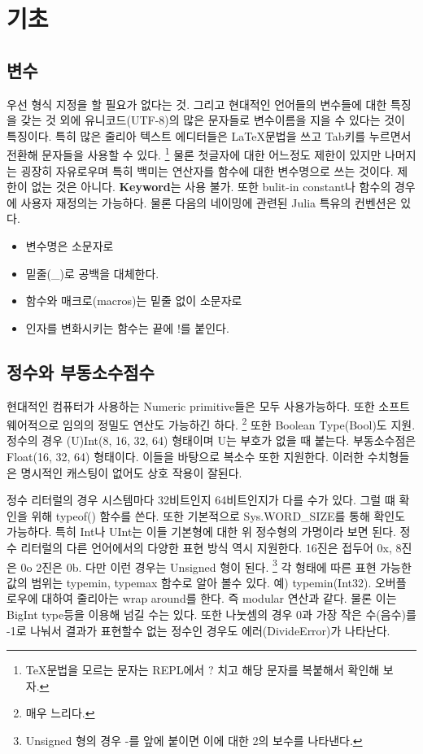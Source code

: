 \documentclass[a4paper, 11pt]{report}
\theoremstyle{definition}
\begin{document}
\section{기초}

\subsection{변수}

우선 형식 지정을 할 필요가 없다는 것. 그리고 현대적인 언어들의 변수들에 대한 특징을 갖는 것 외에
유니코드(UTF-8)의 많은 문자들로 변수이름을 지을 수 있다는 것이 특징이다. 
특히 많은 줄리아 텍스트 에디터들은 \LaTeX 문법을 쓰고 Tab키를 누르면서 전환해 문자들을 사용할 수 있다.
\footnote{\TeX 문법을 모르는 문자는 REPL에서 ? 치고 해당 문자를 복붙해서 확인해 보자.}
물론 첫글자에 대한 어느정도 제한이 있지만 나머지는 굉장히 자유로우며 특히 백미는 연산자를 함수에 대한 변수명으로 쓰는 것이다.
제한이 없는 것은 아니다. \textbf{Keyword}는 사용 불가. 또한 bulit-in constant나 함수의 경우 에 사용자 재정의는 가능하다.
물론 다음의 네이밍에 관련된 Julia 특유의 컨벤션은 있다.
\begin{itemize}
    \item 변수명은 소문자로
    \item 밑줄(\_)로 공백을 대체한다.
    \item 함수와 매크로(macros)는 밑줄 없이 소문자로
    \item 인자를 변화시키는 함수는 끝에 !를 붙인다.
\end{itemize}

\subsection{정수와 부동소수점수}
현대적인 컴퓨터가 사용하는 Numeric primitive들은 모두 사용가능하다. 또한 소프트웨어적으로 임의의 정밀도 연산도 가능하긴 하다.
\footnote{매우 느리다.}
또한 Boolean Type(Bool)도 지원. 정수의 경우  (U)Int(8, 16, 32, 64) 형태이며 U는 부호가 없을 때 붙는다. 부동소수점은 Float(16, 32, 64) 형태이다. 이들을 바탕으로 복소수 또한 지원한다. 이러한 수치형들은 명시적인 캐스팅이 없어도 상호 작용이
잘된다.

정수 리터럴의 경우 시스템마다 32비트인지 64비트인지가 다를 수가 있다. 그럴 떄 확인을 위해 typeof() 함수를 쓴다.
또한 기본적으로 Sys.WORD\_SIZE를 통해 확인도 가능하다. 특히 Int나 UInt는 이들 기본형에 대한 위 정수형의 가명이라 보면 된다.
정수 리터럴의 다른 언어에서의 다양한 표현 방식 역시 지원한다. 16진은 접두어 0x, 8진은 0o 2진은 0b. 다만 이런 경우는 Unsigned 형이 된다.
\footnote{Unsigned 형의 경우 -를 앞에 붙이면 이에 대한 2의 보수를 나타낸다.}
각 형태에 따른 표현 가능한 값의 범위는 typemin, typemax 함수로 알아 볼수 있다. 예) typemin(Int32).
오버플로우에 대하여 줄리아는 wrap around를 한다. 즉 modular 연산과 같다. 물론 이는 BigInt type등을 이용해 넘길 수는 있다.
또한 나눗셈의 경우 0과 가장 작은 수(음수)를 -1로 나눠서 결과가 표현할수 없는 정수인 경우도 에러(DivideError)가 나타난다.
\end{document}
